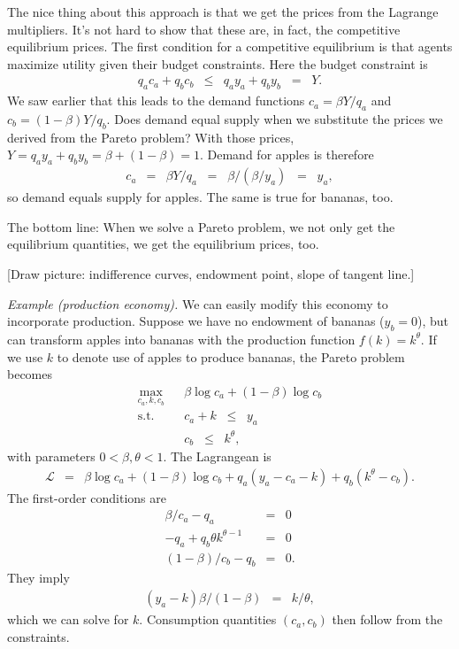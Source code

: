 \documentclass[11pt]{article}
\begin{document}
The nice thing about this approach is that
we get the prices from the Lagrange multipliers.
It's not hard to show that these are, in fact,
the competitive equilibrium prices.
The first condition for a competitive equilibrium is that agents maximize
utility given their budget constraints.
Here the budget constraint is
\begin{eqnarray*}
    q_a c_a + q_b c_b &\leq& q_a y_a + q_b y_b \;\;=\;\; Y.
\end{eqnarray*}
We saw earlier that this leads to the demand functions
$ c_a = \beta Y/q_a$ and $c_b = (1-\beta) Y/q_b$.
Does demand equal supply when we substitute the prices we derived
from the Pareto problem?
With those prices,
$ Y = q_a y_a + q_b y_b = \beta + (1-\beta) = 1$.
Demand for apples is therefore
\begin{eqnarray*}
    c_a &=& \beta Y / q_a \;\;=\;\; \beta / (\beta/y_a) \;\;=\;\; y_ a,
\end{eqnarray*}
so demand equals supply for apples.
The same is true for bananas, too.

The bottom line:  When we solve a Pareto problem,
we not only get the equilibrium quantities,
we get the equilibrium prices, too.


[Draw picture:  indifference curves, endowment point,
slope of tangent line.]

{\it Example (production economy).\/}
We can easily modify this economy to incorporate production.
Suppose we have no endowment of bananas ($y_b=0$),
but can transform apples into bananas with the
production function $f(k) = k^\theta$.
If we use $k$ to denote use of apples to produce bananas,
the Pareto problem becomes
\begin{eqnarray*}
    \max_{c_a,k,c_b} &&  \beta \log c_a + (1-\beta) \log c_b \\
    \mbox{s.t.}   &&  c_a + k \;\;\leq\;\; y_a \\
                  &&  c_b \;\;\leq\;\; k^\theta ,
\end{eqnarray*}
with parameters $ 0 < \beta,\theta < 1$.
The Lagrangean is
\begin{eqnarray*}
    \mathcal{L} &=&  \beta \log c_a + (1-\beta) \log c_b
                + q_a (y_a - c_a - k) + q_b (k^\theta - c_b ) .
\end{eqnarray*}
The first-order conditions are
\begin{eqnarray*}
    \beta/c_a - q_a &=& 0 \\
    - q_a + q_b \theta k^{\theta-1} &=& 0 \\
   (1-\beta)/c_b - q_b &=& 0 .
\end{eqnarray*}
They imply
\begin{eqnarray*}
    (y_a - k) \beta /(1-\beta) &=& k / \theta ,
\end{eqnarray*}
which we can solve for $k$.
Consumption quantities $(c_a,c_b)$ then follow from the
constraints.
\end{document}

